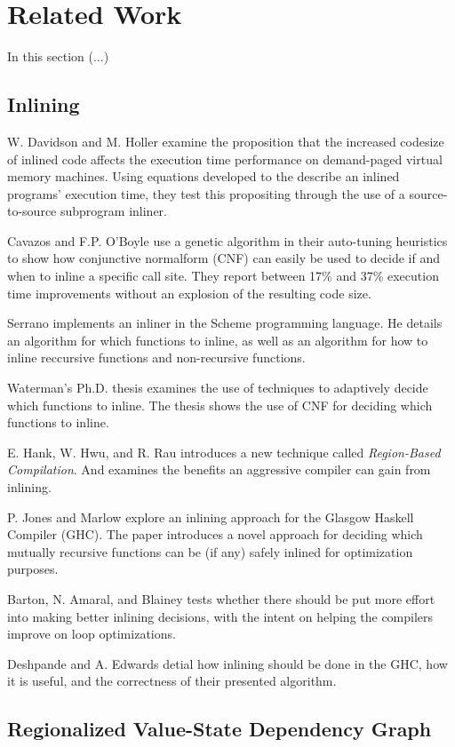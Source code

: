 
\section{Related Work}

In this section (...)

\subsection{Inlining}

W. Davidson and M. Holler \cite{SubprogInlining} examine the proposition that
the increased codesize of inlined code affects the execution time performance on
demand-paged virtual memory machines. Using equations developed to the describe
an inlined programs' execution time, they test this propositing through the use
of a source-to-source subprogram inliner.

Cavazos and F.P. O'Boyle \cite{AutoTuningJavaHeuristics} use a genetic algorithm
in their auto-tuning heuristics to show how conjunctive normalform (CNF) can
easily be used to decide if and when to inline a specific call site. They report
between 17\% and 37\% execution time improvements without an explosion of the resulting code size.

Serrano \cite{InlineWhenHowSerrano} implements an inliner in the Scheme
programming language. He details an algorithm for which functions to inline, as
well as an algorithm for how to inline reccursive functions and non-recursive
functions.

Waterman's Ph.D. thesis \cite{AdaptvCompilAndInlingWaterman} examines the use of
techniques to adaptively decide which functions to inline. The thesis shows the
use of CNF for deciding which functions to inline.

E. Hank, W. Hwu, and R. Rau \cite{RegionBasedCompilationIntroduction} introduces
a new technique called \textit{Region-Based Compilation}. And examines the
benefits an aggressive compiler can gain from inlining.

P. Jones and Marlow \cite{GHCPaper} explore an inlining approach for the Glasgow
Haskell Compiler (GHC). The paper introduces a novel approach for deciding which
mutually recursive functions can be (if any) safely inlined for optimization
purposes.

Barton, N. Amaral, and Blainey \cite{ShouldLoopOptsInfluenceInlining} tests
whether there should be put more effort into making better inlining decisions,
with the intent on helping the compilers improve on loop optimizations.

Deshpande and A. Edwards \cite{deshpande2012statically} detial how inlining
should be done in the GHC, how it is useful, and the correctness of their
presented algorithm.


\subsection{Regionalized Value-State Dependency Graph}
